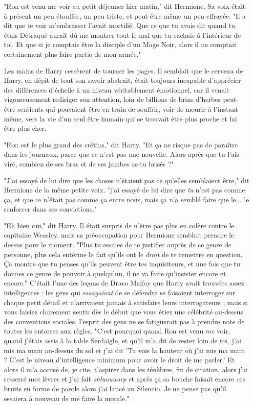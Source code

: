 "Ron est venu me voir au petit déjeuner hier matin," dit Hermione. Sa voix était à présent un peu étouffée, un peu triste, et peut-être même un peu effrayée. "Il a dit que te voir m'embrasser l'avait mortifié. Que ce que tu avais dit quand tu étais Détraqué aurait dû me montrer tout le mal que tu cachais à l'intérieur de toi. Et que si je comptais être la disciple d'un Mage Noir, alors il ne comptait certainement plus faire partie de mon armée."

Les mains de Harry cessèrent de tourner les pages. Il semblait que le cerveau de Harry, en dépit de tout son savoir abstrait, était toujours incapable d'apprécier des différences d'échelle à un niveau véritablement émotionnel, car il venait vigoureusement rediriger son attention, loin de billions de brins d'herbes peut-être sentients qui pouvaient être en train de souffrir, voir de mourir à l'instant même, vers la vie d'un seul être humain qui se trouvait être plus proche et lui être plus cher.

"Ron est le plus grand des crétins," dit Harry. "Et ça ne risque pas de paraître dans les journaux, parce que ce n'est pas une nouvelle. Alors après que tu l'ais viré, combien de ses bras et de ses jambes as-tu brisés ?"

"J'ai essayé de lui dire que les choses n'étaient pas ce qu'elles semblaient être," dit Hermione de la même petite voix. "j'ai essayé de lui dire que \emph{tu}  n'est pas comme ça, et que ce n'était pas comme ça entre nous, mais ça n'a semblé faire que le... le renforcer dans ses convictions."

"Eh bien oui," dit Harry. Il était surpris de n'être pas plus en colère contre le capitaine Weasley, mais sa préoccupation pour Hermione semblait prendre le dessus pour le moment. "Plus tu essaies de te justifier auprès de ce genre de personne, plus cela entérine le fait qu'ils ont le \emph{droit}  de te remettre en question. Ça montre que tu penses qu'ils peuvent être tes inquisiteurs, et une fois que tu donnes ce genre de pouvoir à quelqu'un, il ne va faire qu'insister encore et encore." C'était l'une des leçons de Draco Malfoy que Harry avait trouvées assez intelligentes : les gens qui \emph{essayaient}  de se défendre se faisaient interroger sur chaque petit détail et n'arrivaient jamais à satisfaire leurs interrogateurs ; mais si vous faisiez clairement sentir dès le début que vous étiez une célébrité au-dessus des conventions sociales, l'esprit des gens ne se fatiguerait pas à prendre note de toutes les entorses aux règles. "C'est pourquoi quand Ron est venu \emph{me}  voir, quand j'étais assis à la table Serdaigle, et qu'il m'a dit de rester loin de toi, j'ai mis ma main au-dessus du sol et j'ai dit 'Tu vois la hauteur où j'ai mis ma main ? C'est le niveau d'intelligence minimum pour avoir le droit de me parler.' Et alors il m'a accusé de, je cite, t'aspirer dans les ténèbres, fin de citation, alors j'ai resserré mes lèvres et j'ai fait \emph{shluuuuurp}  et après ça sa bouche faisait encore ces bruits en forme de parole alors j'ai lancé un Silencio. Je ne pense pas qu'il essaiera à nouveau de me faire la morale."

